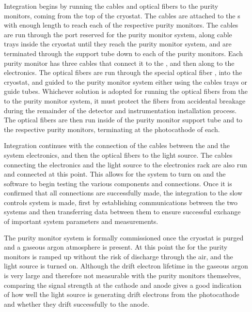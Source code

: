 Integration begins by running the  cables and optical fibers to the purity monitors, coming from the top of the cryostat.  The  cables are attached to the  \fdth{}s with enough length to reach each of the respective purity monitors.  The cables are run through the port reserved for the purity monitor system, along cable trays inside the cryostat until they reach the purity monitor system, and are terminated through the support tube down to each of the purity monitors.  Each purity monitor has three  cables that connect it to the \fdth, and then along to the  electronics.  The optical fibers are run through the special optical fiber \fdth, into the cryostat, and guided to the purity monitor system either using the cables trays or guide tubes.  Whichever solution is adopted for running the optical fibers from the \fdth to the purity monitor system, it must protect the fibers from accidental breakage during the remainder of the detector and instrumentation installation process.  The optical fibers are then run inside of the purity monitor support tube and to the respective purity monitors,  terminating at the photocathode of each. %

Integration  continues with the connection of the  cables between the \fdth and the system  electronics, and then the optical fibers to the light source.  The cables connecting the  electronics and the light source to the electronics rack are also run and connected at this point.  This allows for the system to turn on and the software to begin testing the various components and connections.  Once it is confirmed that all connections are successfully made, the integration to the slow controls system is made, first by establishing communications between the two systems and then transferring data between them to ensure successful exchange of important system parameters and measurements.  

The purity monitor system is formally commissioned %
once the cryostat is purged and a gaseous argon atmosphere is present.  At this point the  for the purity monitors is ramped up without the risk of discharge through the air, and the light source is turned on.  Although the drift electron lifetime in the gaseous argon is very large and therefore not measurable with the purity monitors themselves, comparing the signal strength at the cathode and anode gives a good indication of how well the light source is generating drift electrons from the photocathode and whether they drift successfully to the anode. %



